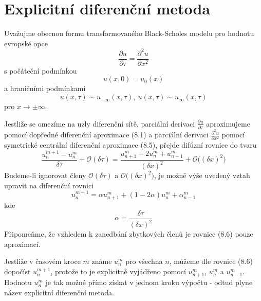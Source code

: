 \documentclass[a4paper]{book}
\begin{document}
\section{Explicitní diferenční metoda}

Uvažujme obecnou formu transformovaného Black-Scholes modelu pro hodnotu evropské opce
\begin{equation*}
\frac{\partial u}{\partial \tau} = \frac{\partial^2 u}{\partial x^2}
\end{equation*}
s počáteční podmínkou
\begin{equation}
u(x, 0) = u_0(x)
\end{equation}
a hraničními podmínkami
\begin{equation}
u(x, \tau) \sim u_{- \infty}(x, \tau),~u(x, \tau) \sim u_{\infty}(x, \tau)
\end{equation}
pro $x \rightarrow \pm \infty$.

Jestliže se omezíme na uzly diferenční sítě, parciální derivaci $\frac{\partial u}{\partial \tau}$ aproximujeme pomocí dopředné diferenční aproximace (8.1) a parciální derivaci $\frac{\partial^2 u}{\partial x^2}$ pomocí symetrické centrální diferenční aproximace (8.5), přejde difúzní rovnice do tvaru
\begin{equation*}
\frac{u_n^{m+1} - u_n^m}{\delta \tau} + \mathcal{O}(\delta \tau) = \frac{u_{n+1}^m - 2u_n^m + u_{n-1}^m}{(\delta x)^2} + \mathcal{O} \Big( (\delta x)^2 \Big)
\end{equation*}
Budeme-li ignorovat členy $\mathcal{O}(\delta \tau)$ a $\mathcal{O} \Big( (\delta x)^2 \Big)$, je možné výše uvedený vztah upravit na diferenční rovnici
\begin{equation}
u_n^{m+1} = \alpha u_{n+1}^m + (1 - 2 \alpha)u_n^m + \alpha_{n-1}^m
\end{equation}
kde
\begin{equation*}
\alpha = \frac{\delta \tau}{(\delta x)^2}
\end{equation*}
Připomeňme, že vzhledem k zanedbání zbytkových členů je rovnice (8.6) pouze aproximací.

Jestliže v časovém kroce $m$ známe $u_n^m$ pro všechna $n$, můžeme dle rovnice (8.6) dopočíst $u_n^{m+1}$, protože to je explicitně vyjádřeno pomocí $u_{n+1}^m$, $u_n^m$ a $u_{n-1}^m$. Hodnotu $u_n^m$ je tak možné přímo získat v jednom kroku výpočtu - odtud plyne název explicitní diferenční metoda.
\end{document}
